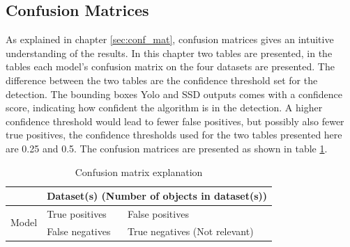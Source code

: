 \subsection{Confusion Matrices}
\label{subsec:cm}

As explained in chapter \ref{sec:conf_mat}, confusion matrices gives an intuitive understanding of the results. In this chapter two tables are presented, in the tables each model's confusion matrix on the four datasets are presented. The difference between the two tables are the confidence threshold set for the detection. The bounding boxes Yolo and SSD outputs comes with a confidence score, indicating how confident the algorithm is in the detection. A higher confidence threshold would lead to fewer false positives, but possibly also fewer true positives, the confidence thresholds used for the two tables presented here are 0.25 and 0.5. The confusion matrices are presented as shown in table \ref{tab:conf_exp}.



\begin{table}[h!]
\centering
\begin{tabular}{c|ll}
\multicolumn{1}{l|}{}  & \multicolumn{2}{l}{Dataset(s) (Number of objects in dataset(s))} \\ \hline
\multirow{2}{*}{Model} & True positives        & False positives                    \\
                       & False negatives       & True negatives (Not relevant)     
\end{tabular}
\caption{Confusion matrix explanation}
\label{tab:conf_exp}
\end{table}

